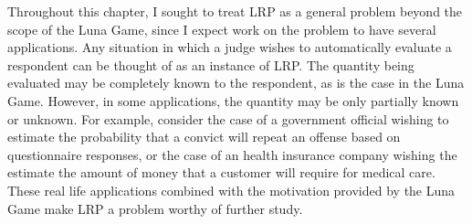 Throughout this chapter, I sought to treat LRP as a general problem beyond the scope of the Luna Game, since I expect work on the problem to have several applications. Any situation in which a judge wishes to automatically evaluate a respondent can be thought of as an instance of LRP. The quantity being evaluated may be completely known to the respondent, as is the case in the Luna Game. However, in some applications, the quantity may be only partially known or unknown. For example, consider the case of a government official wishing to estimate the probability that a convict will repeat an offense based on questionnaire responses, or the case of an health insurance company wishing the estimate the amount of money that a customer will require for medical care. These real life applications combined with the motivation provided by the Luna Game make LRP a problem worthy of further study.
